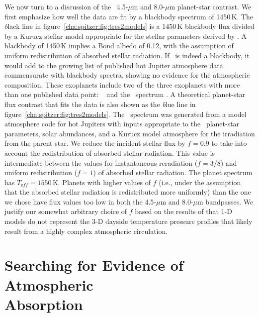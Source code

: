 We now turn to a discussion of the \tresTwo\ 4.5-$\mu$m and 8.0-$\mu$m planet-star contrast.
We first emphasize how well the data are fit by a blackbody spectrum of 1450\,K.
The {\textit black line} in figure~\ref{cha:spitzer:fig:tres2models} is a 1450\,K blackbody flux divided by a Kurucz stellar model appropriate for the stellar parameters derived by \citet{Sozzetti_Torres_Charbonneau:apj:2007a}.
A blackbody of 1450\,K implies a Bond albedo of 0.12, with the assumption of uniform redistribution of absorbed stellar radiation.
If \tresTwo\ is indeed a blackbody, it would add to the growing list of published hot Jupiter atmosphere data commensurate with blackbody spectra, showing no evidence for the atmospheric composition.
These exoplanets include two of the three exoplanets with more than one published data point: \tresOne\ \citep{Charbonneau_Allen_Megeath:apj:2005a} and the \hdOENb\ spectrum \citep{Grillmair_Charbonneau_Burrows:apjl:2007a}.
A theoretical planet-star flux contrast that fits the data is also shown as the {\textit blue line} in figure~\ref{cha:spitzer:fig:tres2models}.
The \tresTwo\ spectrum was generated from a model atmosphere code for hot Jupiters \citep{Seager_Richardson_Hansen:apj:2005a} with inputs appropriate to the \tresTwo\ planet-star parameters, solar abundances, and a Kurucz model atmosphere for the irradiation from the parent star.
We reduce the incident stellar flux by \mbox{$f=0.9$} to take into account the redistribution of absorbed stellar radiation.
This value is intermediate between the values for instantaneous reradiation (\mbox{$f=3/8$}) and uniform redistribution (\mbox{$f=1$}) of absorbed stellar radiation.
The planet spectrum has \mbox{$T_{\mathrm eff}=1550$\,K}.
Planets with higher values of $f$ (i.e., under the assumption that the absorbed stellar radiation is redistributed more uniformly) than the one we chose have flux values too low in both the 4.5-$\mu$m and 8.0-$\mu$m bandpasses.
We justify our somewhat arbitrary choice of $f$ based on the results of \citet{Fortney_Cooper_Showman:apj:2006a} that 1-D models do not represent the 3-D dayside temperature pressure profiles that likely result from a highly complex atmospheric circulation.

\section[Searching for Evidence of Atmospheric Absorption]{Searching for Evidence of Atmospheric \\ Absorption}\label{cha:spitzer:sec:discuss}

